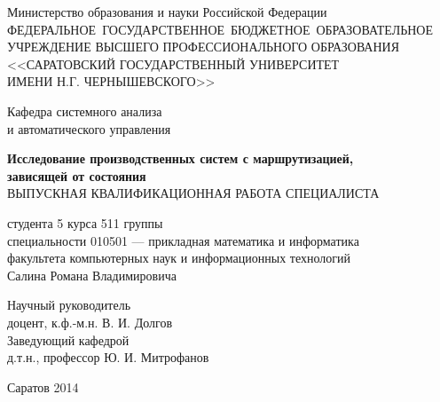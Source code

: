 \thispagestyle{empty}
\begin{center}
\singlespacing
Министерство образования и науки Российской Федерации\\
\medskip
\mbox{ФЕДЕРАЛЬНОЕ ГОСУДАРСТВЕННОЕ БЮДЖЕТНОЕ ОБРАЗОВАТЕЛЬНОЕ}\\
УЧРЕЖДЕНИЕ ВЫСШЕГО ПРОФЕССИОНАЛЬНОГО ОБРАЗОВАНИЯ\\
<<САРАТОВСКИЙ ГОСУДАРСТВЕННЫЙ УНИВЕРСИТЕТ\\
ИМЕНИ Н.Г. ЧЕРНЫШЕВСКОГО>>
\end{center}

\vspace{0.5cm}
\begin{flushright}
\parbox{6.8cm}{
\raggedright
  Кафедра системного анализа \\ и автоматического управления
}
\end{flushright}

\vspace{1cm}
\begin{center}
\textbf{Исследование производственных систем с маршрутизацией,\\зависящей от состояния}\\
\medskip
ВЫПУСКНАЯ КВАЛИФИКАЦИОННАЯ РАБОТА СПЕЦИАЛИСТА
\end{center}
\begin{flushleft}
студента 5 курса 511 группы\\
специальности 010501 --- прикладная математика и информатика\\
факультета компьютерных наук и информационных технологий\\
Салина Романа Владимировича
\end{flushleft}
\vspace{1cm}

\vfill

\noindent
\begin{flushleft}
Научный руководитель\\
доцент, к.ф.-м.н. \hfill В. И. Долгов\\
\vspace{10mm}
Заведующий кафедрой\\
д.т.н., профессор \hfill Ю. И. Митрофанов
\end{flushleft}

\vfill

\begin{center}
Саратов 2014
\end{center}
